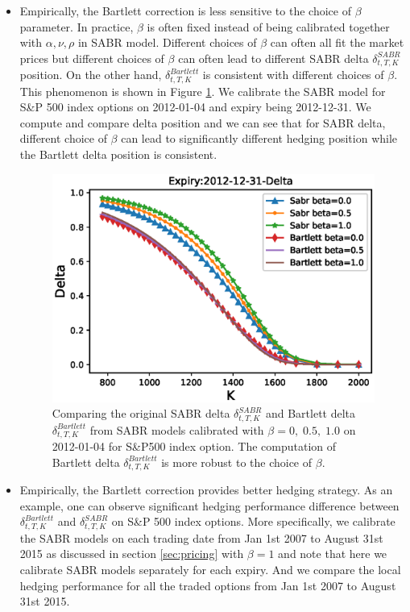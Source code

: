 \documentclass[letterpaper,12pt,titlepage,oneside,final]{book}
\numberwithin{equation}{section}
\theoremstyle{definition}
\begin{document}
\begin{itemize}
    \item Empirically, the Bartlett correction is less sensitive to the choice of $\beta$ parameter. In practice,  $\beta$ is often fixed instead of being calibrated together with $\alpha,\nu,\rho$ in SABR model. Different choices of $\beta$ can often all fit the market prices but different choices of $\beta$ can often lead to different SABR delta $\delta^{SABR}_{t,T,K}$ position. On the other hand,  $\delta^{Bartlett}_{t,T,K}$ is consistent with different choices of $\beta$. This phenomenon is shown in Figure \ref{fig:Bartlett}. We calibrate the SABR model for S\&P 500 index options  on  2012-01-04 and expiry being 2012-12-31. We compute and compare delta position and we can see that for SABR delta, different choice of $\beta$ can lead to  significantly different hedging position while the Bartlett delta position is consistent.
    \begin{figure}[htp!]
        \includegraphics[width=\textwidth]{./figures/Bartlett}
        \caption{Comparing the original SABR delta $\delta^{SABR}_{t,T,K}$ and Bartlett delta  $\delta^{Bartlett}_{t,T,K}$ from SABR models calibrated with $\beta=0,\; 0.5, \;1.0$ on 2012-01-04 for S\&P500 index option. The computation of Bartlett delta  $\delta^{Bartlett}_{t,T,K}$ is more robust to the choice of $\beta$.}
        \label{fig:Bartlett}
    \end{figure}
    \item  Empirically, the Bartlett correction provides better hedging strategy. As an example, one can observe significant  hedging performance difference between $\delta^{Bartlett}_{t,T,K}$ and  $\delta^{SABR}_{t,T,K}$  on S\&P 500 index options. More specifically, we calibrate the SABR models on each trading date from Jan 1st 2007 to August 31st 2015 as discussed in section \ref{sec:pricing} with $\beta=1$ and note that here we calibrate SABR models separately for each expiry. And we compare the local hedging performance for all the traded options from Jan 1st 2007 to August 31st 2015.

\end{itemize}
\end{document}
